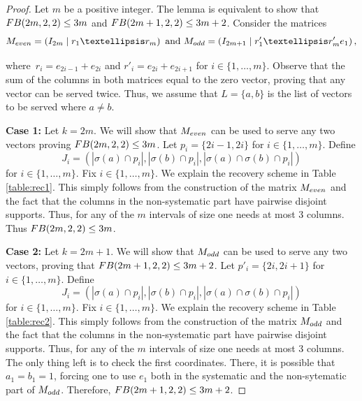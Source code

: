 \documentclass[10pt,a4paper]{amsart}
\newcommand{\fb}{\textnormal{FB}}
\begin{document}
\begin{proof}
Let $m$ be a positive integer. The lemma is equivalent to show that $\fb(2m,2,2) \le 3m$ and $\fb(2m+1,2,2) \le 3m+2$. Consider the matrices
$$M_{\textnormal{even}} = \left( I_{2m} \mid r_1 \ldots r_m\right) \mbox{ and }M_{\textnormal{odd}} = \left( I_{2m+1} \mid r'_1 \ldots r'_m e_1\right),$$

where~$r_i = e_{2i-1}+e_{2i}$ and $r'_i = e_{2i}+e_{2i+1}$ for $i \in \{1,\ldots,m\}$. Observe that the sum of the columns in both matrices equal to the zero vector, proving that any vector can be served twice. Thus, we assume that $L =\{a,b\}$ is the list of vectors to be served where $a \neq b$. 

\textbf{Case 1: }Let $k=2m$. We will show that $M_{\textnormal{even}}$ can be used to serve any two vectors proving $\fb(2m,2,2) \le 3m$. Let $p_i = \{2i-1,2i\}$ for $i \in \{1,\ldots,m\}$. Define $$J_i =(|\sigma(a) \cap p_i|,|\sigma(b) \cap p_i|,|\sigma(a) \cap \sigma(b) \cap p_i|)$$ for $i \in \{1,\ldots,m\}$.
Fix $i \in \{1,\ldots,m\}$. We explain the recovery scheme in Table \ref{table:rec1}. This simply follows from the construction of the matrix $M_{\textnormal{even}}$ and the fact that the columns in the non-systematic part have pairwise disjoint supports. Thus, for any of the $m$ intervals of size one needs at most 3 columns. Thus $\fb(2m,2,2) \le 3m$.

\textbf{Case 2: }Let $k=2m+1$. We will show that $M_{\textnormal{odd}}$ can be used to serve any two vectors, proving that $\fb(2m+1,2,2) \le 3m+2$. Let $p'_i = \{2i,2i+1\}$ for $i \in \{1,\ldots,m\}$. Define $$J_i =(|\sigma(a) \cap p_i|,|\sigma(b) \cap p_i|,|\sigma(a) \cap \sigma(b) \cap p_i|)$$ for $i \in \{1,\ldots,m\}$. Fix $i \in \{1,\ldots,m\}$. We explain the recovery scheme in Table \ref{table:rec2}. This simply follows from the construction of the matrix $M_{\textnormal{odd}}$ and the fact that the columns in the non-systematic part have pairwise disjoint supports. Thus, for any of the $m$ intervals of size one needs at most 3 columns. The only thing left is to check the first coordinates. There, it is possible that $a_1=b_1=1$, forcing one to use $e_1$ both in the systematic and the non-sytematic part of $M_{\textnormal{odd}}$. Therefore, $\fb(2m+1,2,2) \le 3m+2$. \qedhere



\end{proof}
\end{document}
